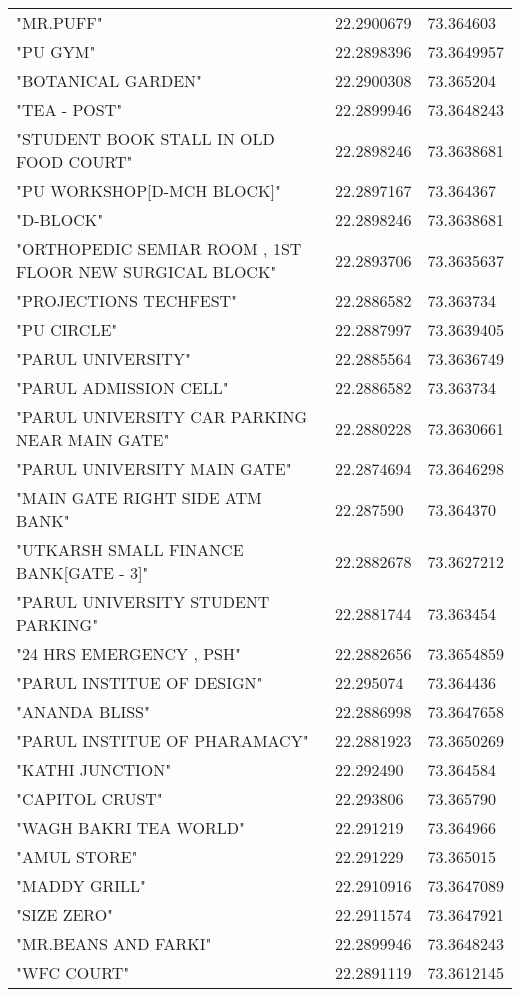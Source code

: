 \begin{center}
\begin{longtable}{|l|l|l|}
"MR.PUFF" & 22.2900679 & 73.364603 \\
"PU GYM" & 22.2898396 & 73.3649957 \\
"BOTANICAL GARDEN" & 22.2900308 & 73.365204 \\
"TEA - POST" & 22.2899946 & 73.3648243 \\
"STUDENT BOOK STALL IN OLD FOOD COURT" & 22.2898246 & 73.3638681 \\
"PU WORKSHOP[D-MCH BLOCK]" & 22.2897167 & 73.364367 \\
"D-BLOCK" & 22.2898246 & 73.3638681 \\
"ORTHOPEDIC SEMIAR ROOM , 1ST FLOOR NEW SURGICAL BLOCK" & 22.2893706 & 73.3635637 \\
"PROJECTIONS TECHFEST" & 22.2886582 & 73.363734 \\
"PU CIRCLE" & 22.2887997 & 73.3639405 \\
"PARUL UNIVERSITY" & 22.2885564 & 73.3636749 \\
"PARUL ADMISSION CELL" & 22.2886582 & 73.363734 \\
"PARUL UNIVERSITY CAR PARKING NEAR MAIN GATE" & 22.2880228 & 73.3630661 \\
"PARUL UNIVERSITY MAIN GATE" & 22.2874694 & 73.3646298 \\
"MAIN GATE RIGHT SIDE ATM BANK" & 22.287590 & 73.364370 \\
"UTKARSH SMALL FINANCE BANK[GATE - 3]" & 22.2882678 & 73.3627212 \\
"PARUL UNIVERSITY STUDENT PARKING" & 22.2881744 & 73.363454 \\
"24 HRS EMERGENCY , PSH" & 22.2882656 & 73.3654859 \\
"PARUL INSTITUE OF DESIGN" & 22.295074 & 73.364436 \\
"ANANDA BLISS" & 22.2886998 & 73.3647658 \\
"PARUL INSTITUE OF PHARAMACY" & 22.2881923 & 73.3650269 \\
"KATHI JUNCTION" & 22.292490 & 73.364584 \\
"CAPITOL CRUST" & 22.293806 & 73.365790 \\
"WAGH BAKRI TEA WORLD" & 22.291219 & 73.364966 \\
"AMUL STORE" & 22.291229 & 73.365015 \\
"MADDY GRILL" & 22.2910916 & 73.3647089 \\
"SIZE ZERO" & 22.2911574 & 73.3647921 \\
"MR.BEANS AND FARKI" & 22.2899946 & 73.3648243 \\
"WFC COURT" & 22.2891119 & 73.3612145 \\

\end{longtable}
\end{center}
